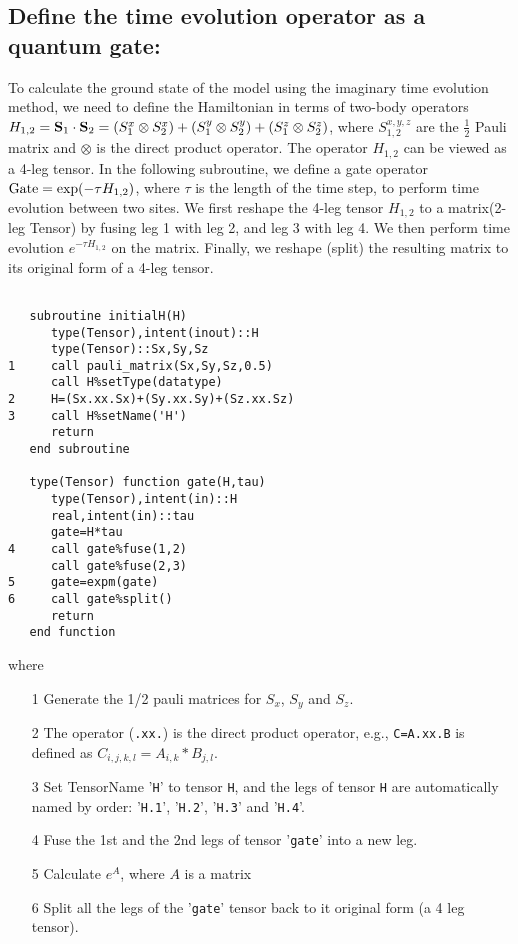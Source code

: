 \documentclass[preprint,3p,times,preprint,showpacs,amsmath,superscriptaddress,floatfix]{elsarticle}
\begin{document}
\subsection{Define the time evolution operator as a quantum gate:}

 To calculate the ground state of the model using the imaginary time evolution method, we need to define the Hamiltonian
 in terms of two-body operators $H_{1,2}={\bf S}_1\cdot {\bf S}_2=(S_1^x\otimes S_2^x)+(S_1^y\otimes S_2^y)+(S_1^z\otimes S_2^z)$, where $S_{1,2}^{x,y,z}$ are the $\frac{1}{2}$ Pauli matrix and $\otimes$ is the direct product operator.
 The operator $H_{1,2}$ can be viewed as a 4-leg tensor. In the following subroutine, we
 define a gate operator ${\rm Gate}={\rm exp}(-\tau H_{1,2})$, where $\tau$ is the length of the time step,
  to perform time evolution between two sites. We first reshape the 4-leg tensor $H_{1,2}$ to a matrix(2-leg Tensor) by fusing leg 1 with leg 2, and leg 3 with leg 4. We then perform time evolution $e^{-\tau H_{1,2}}$ on the matrix. Finally, we reshape (split) the resulting matrix to its original form of a 4-leg tensor.

\begin{verbatim}

   subroutine initialH(H)
      type(Tensor),intent(inout)::H
      type(Tensor)::Sx,Sy,Sz
1     call pauli_matrix(Sx,Sy,Sz,0.5)
      call H%setType(datatype)
2     H=(Sx.xx.Sx)+(Sy.xx.Sy)+(Sz.xx.Sz)
3     call H%setName('H')
      return
   end subroutine

   type(Tensor) function gate(H,tau)
      type(Tensor),intent(in)::H
      real,intent(in)::tau
      gate=H*tau
4     call gate%fuse(1,2)
      call gate%fuse(2,3)
5     gate=expm(gate)
6     call gate%split()
      return
   end function
\end{verbatim}
where
\begin{enumerate}
	\item[1] Generate the 1/2 pauli matrices for $S_x$, $S_y$ and $S_z$.
	\item[2] The operator ({\tt .xx.}) is the direct product operator, e.g., {\tt C=A.xx.B} is defined as $C_{i,j,k,l}=A_{i,k}*B_{j,l}$.
	\item[3] Set TensorName '{\tt H}' to tensor {\tt H}, and the legs of tensor {\tt H} are automatically named by order: '{\tt H.1}', '{\tt H.2}',
'{\tt H.3}' and '{\tt H.4}'.
	\item[4] Fuse the 1st and the 2nd legs of tensor '{\tt gate}' into a new leg.
	\item[5] Calculate $e^{A}$, where $A$ is a matrix
	\item[6] Split all the legs of the '{\tt gate}' tensor back to it original form (a 4 leg tensor).
\end{enumerate}
\end{document}
